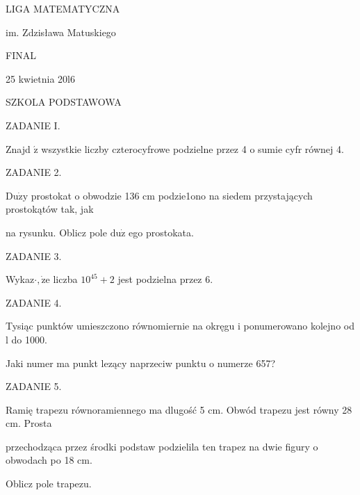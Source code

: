 \documentclass[a4paper,12pt]{article}
\begin{document}
LIGA MATEMATYCZNA

im. Zdzisława Matuskiego

FINAL

25 kwietnia 20l6

SZKOLA PODSTAWOWA

ZADANIE I.

Znajd $\acute{\mathrm{z}}$ wszystkie liczby czterocyfrowe podzielne przez 4 o sumie cyfr równej 4.

ZADANIE 2.

$\mathrm{D}\mathrm{u}\dot{\mathrm{z}}\mathrm{y}$ prostokat o obwodzie 136 cm podzie1ono na siedem przystających prostokątów tak, jak

na rysunku. Oblicz pole $\mathrm{d}\mathrm{u}\dot{\mathrm{z}}$ ego prostokata.

ZADANIE 3.

Wykaz$\cdot, \dot{\mathrm{z}}\mathrm{e}$ liczba $10^{45}+2$ jest podzielna przez 6.

ZADANIE 4.

Tysiąc punktów umieszczono równomiernie na okręgu i ponumerowano kolejno od l do 1000.

Jaki numer ma punkt lezący naprzeciw punktu o numerze 657?

ZADANIE 5.

Ramię trapezu równoramiennego ma dlugość 5 cm. Obwód trapezu jest równy 28 cm. Prosta

przechodząca przez środki podstaw podzielila ten trapez na dwie figury o obwodach po 18 cm.

Oblicz pole trapezu.
\end{document}
